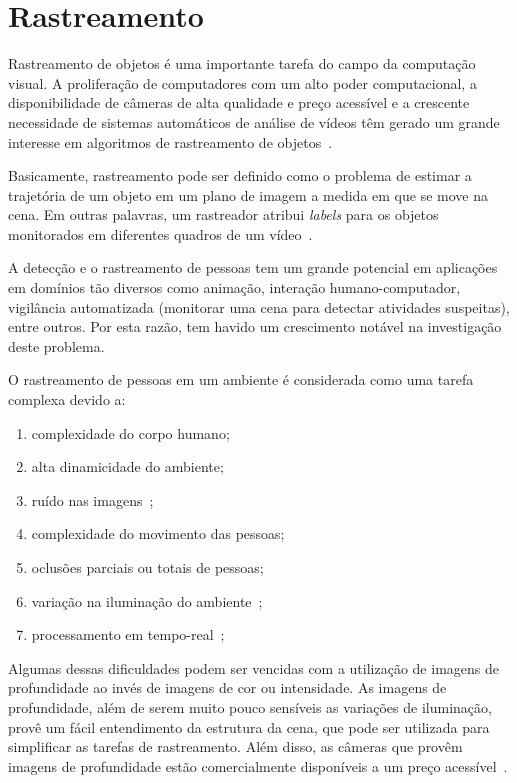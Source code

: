 \section {Rastreamento}	

	Rastreamento de objetos é uma importante tarefa do campo da computação visual. A proliferação de computadores com um alto poder computacional, a disponibilidade de câmeras de alta qualidade e preço acessível e a crescente necessidade de sistemas automáticos de análise de vídeos têm gerado um grande interesse em algoritmos de rastreamento de objetos~\cite{yilmaz}.

	Basicamente, rastreamento pode ser definido como o problema de estimar a trajetória de um objeto em um plano de imagem a medida em que se move na cena. Em outras palavras, um rastreador atribui \textit{labels} para os objetos monitorados em diferentes quadros de um vídeo~\cite{yilmaz}.

	A detecção e o rastreamento de pessoas tem um grande potencial em aplicações em domínios tão diversos como animação, interação humano-computador, vigilância automatizada (monitorar uma cena para detectar atividades suspeitas), entre outros. Por esta razão, tem havido um crescimento notável na investigação deste problema.

	O rastreamento de pessoas em um ambiente é considerada como uma tarefa complexa devido a:

		\begin{enumerate}
			\item complexidade do corpo humano;
			\item alta dinamicidade do ambiente;
			\item ruído nas imagens~\cite{yilmaz};
			\item complexidade do movimento das pessoas;
			\item oclusões parciais ou totais de pessoas;
			\item variação na iluminação do ambiente~\cite{yilmaz};
			\item processamento em tempo-real~\cite{yilmaz};
		\end{enumerate}

	Algumas dessas dificuldades podem ser vencidas com a utilização de imagens de profundidade ao invés de imagens de cor ou intensidade. As imagens de profundidade, além de serem muito pouco sensíveis as variações de iluminação, provê um fácil entendimento da estrutura da cena, que pode ser utilizada para simplificar as tarefas de rastreamento. Além disso, as câmeras que provêm imagens de profundidade estão comercialmente disponíveis a um preço acessível~\cite{nikos}.

